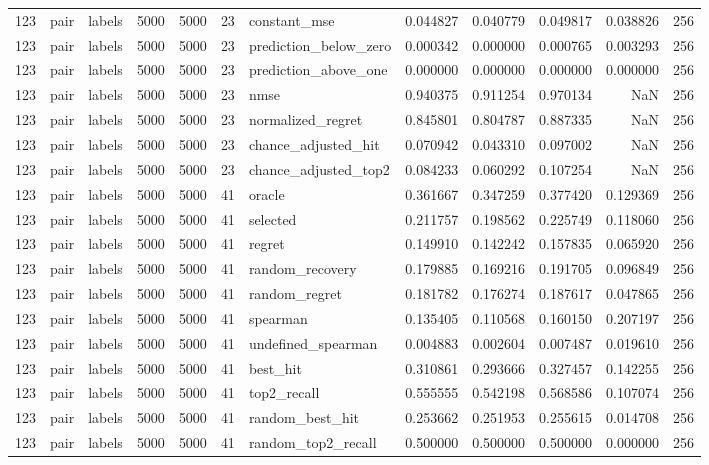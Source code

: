 \begin{tabular}{rllrrrlrrrrr}
123 & pair & labels & 5000 & 5000 & 23 & constant_mse & 0.044827 & 0.040779 & 0.049817 & 0.038826 & 256 \\
123 & pair & labels & 5000 & 5000 & 23 & prediction_below_zero & 0.000342 & 0.000000 & 0.000765 & 0.003293 & 256 \\
123 & pair & labels & 5000 & 5000 & 23 & prediction_above_one & 0.000000 & 0.000000 & 0.000000 & 0.000000 & 256 \\
123 & pair & labels & 5000 & 5000 & 23 & nmse & 0.940375 & 0.911254 & 0.970134 & NaN & 256 \\
123 & pair & labels & 5000 & 5000 & 23 & normalized_regret & 0.845801 & 0.804787 & 0.887335 & NaN & 256 \\
123 & pair & labels & 5000 & 5000 & 23 & chance_adjusted_hit & 0.070942 & 0.043310 & 0.097002 & NaN & 256 \\
123 & pair & labels & 5000 & 5000 & 23 & chance_adjusted_top2 & 0.084233 & 0.060292 & 0.107254 & NaN & 256 \\
123 & pair & labels & 5000 & 5000 & 41 & oracle & 0.361667 & 0.347259 & 0.377420 & 0.129369 & 256 \\
123 & pair & labels & 5000 & 5000 & 41 & selected & 0.211757 & 0.198562 & 0.225749 & 0.118060 & 256 \\
123 & pair & labels & 5000 & 5000 & 41 & regret & 0.149910 & 0.142242 & 0.157835 & 0.065920 & 256 \\
123 & pair & labels & 5000 & 5000 & 41 & random_recovery & 0.179885 & 0.169216 & 0.191705 & 0.096849 & 256 \\
123 & pair & labels & 5000 & 5000 & 41 & random_regret & 0.181782 & 0.176274 & 0.187617 & 0.047865 & 256 \\
123 & pair & labels & 5000 & 5000 & 41 & spearman & 0.135405 & 0.110568 & 0.160150 & 0.207197 & 256 \\
123 & pair & labels & 5000 & 5000 & 41 & undefined_spearman & 0.004883 & 0.002604 & 0.007487 & 0.019610 & 256 \\
123 & pair & labels & 5000 & 5000 & 41 & best_hit & 0.310861 & 0.293666 & 0.327457 & 0.142255 & 256 \\
123 & pair & labels & 5000 & 5000 & 41 & top2_recall & 0.555555 & 0.542198 & 0.568586 & 0.107074 & 256 \\
123 & pair & labels & 5000 & 5000 & 41 & random_best_hit & 0.253662 & 0.251953 & 0.255615 & 0.014708 & 256 \\
123 & pair & labels & 5000 & 5000 & 41 & random_top2_recall & 0.500000 & 0.500000 & 0.500000 & 0.000000 & 256 \\

\end{tabular}
